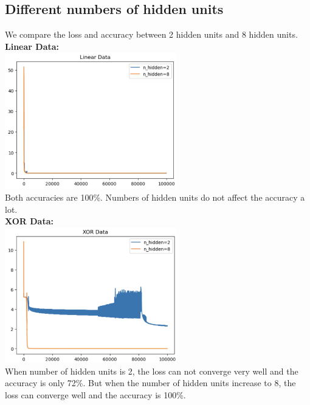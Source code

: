 \documentclass{article} %
\begin{document}
    \subsection{Different numbers of hidden units}
    We compare the loss and accuracy between 2 hidden units and 8 hidden units. \\
    \textbf{Linear Data:} \\
    \includegraphics[width=7.5cm]{./imgs/linear_n_hidden.png} \\
    Both accuracies are 100\%. Numbers of hidden units do not affect the accuracy a lot. \\
    \textbf{XOR Data:} \\
    \includegraphics[width=7.5cm]{./imgs/xor_n_hidden.png} \\
    When number of hidden units is 2, the loss can not converge very well and the accuracy is only 72\%.
    But when the number of hidden units increase to 8, the loss can converge well and the accuracy is 100\%. \\
    
\end{document}

